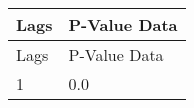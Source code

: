 \begin{tabular}{ll}
\hline
 Lags   & P-Value Data   \\
\hline
 Lags   & P-Value Data   \\
 1      & 0.0            \\
\hline
\end{tabular}